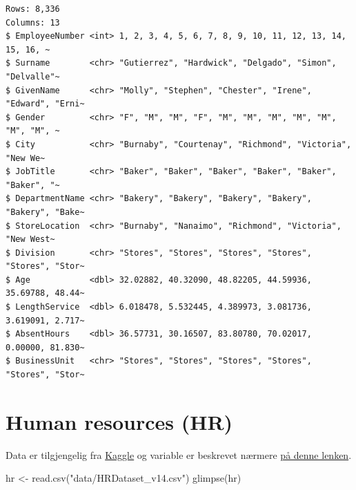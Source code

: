 \documentclass[
  letterpaper,
  DIV=11,
  numbers=noendperiod]{scrreprt}
\newenvironment{Shaded}{\begin{snugshade}}{\end{snugshade}}
\newcommand{\FunctionTok}[1]{\textcolor[rgb]{0.28,0.35,0.67}{#1}}
\newcommand{\NormalTok}[1]{\textcolor[rgb]{0.00,0.23,0.31}{#1}}
\newcommand{\OtherTok}[1]{\textcolor[rgb]{0.00,0.23,0.31}{#1}}
\newcommand{\StringTok}[1]{\textcolor[rgb]{0.13,0.47,0.30}{#1}}
\theoremstyle{definition}
\theoremstyle{remark}
\begin{document}
\begin{verbatim}
Rows: 8,336
Columns: 13
$ EmployeeNumber <int> 1, 2, 3, 4, 5, 6, 7, 8, 9, 10, 11, 12, 13, 14, 15, 16, ~
$ Surname        <chr> "Gutierrez", "Hardwick", "Delgado", "Simon", "Delvalle"~
$ GivenName      <chr> "Molly", "Stephen", "Chester", "Irene", "Edward", "Erni~
$ Gender         <chr> "F", "M", "M", "F", "M", "M", "M", "M", "M", "M", "M", ~
$ City           <chr> "Burnaby", "Courtenay", "Richmond", "Victoria", "New We~
$ JobTitle       <chr> "Baker", "Baker", "Baker", "Baker", "Baker", "Baker", "~
$ DepartmentName <chr> "Bakery", "Bakery", "Bakery", "Bakery", "Bakery", "Bake~
$ StoreLocation  <chr> "Burnaby", "Nanaimo", "Richmond", "Victoria", "New West~
$ Division       <chr> "Stores", "Stores", "Stores", "Stores", "Stores", "Stor~
$ Age            <dbl> 32.02882, 40.32090, 48.82205, 44.59936, 35.69788, 48.44~
$ LengthService  <dbl> 6.018478, 5.532445, 4.389973, 3.081736, 3.619091, 2.717~
$ AbsentHours    <dbl> 36.57731, 30.16507, 83.80780, 70.02017, 0.00000, 81.830~
$ BusinessUnit   <chr> "Stores", "Stores", "Stores", "Stores", "Stores", "Stor~
\end{verbatim}

\hypertarget{human-resources-hr}{%
\section{Human resources (HR)}\label{human-resources-hr}}

Data er tilgjengelig fra
\href{https://www.kaggle.com/datasets/rhuebner/human-resources-data-set}{Kaggle}
og variable er beskrevet nærmere
\href{https://rpubs.com/rhuebner/hrd_cb_v14}{på denne lenken}.

\begin{Shaded}
\begin{Highlighting}[]
\NormalTok{hr }\OtherTok{\textless{}{-}} \FunctionTok{read.csv}\NormalTok{(}\StringTok{"data/HRDataset\_v14.csv"}\NormalTok{)}
\FunctionTok{glimpse}\NormalTok{(hr)}
\end{Highlighting}
\end{Shaded}
\end{document}
